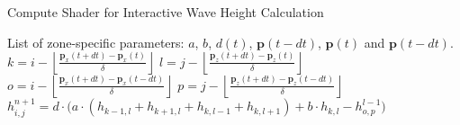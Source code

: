 \begin{algorithm}
\caption{Compute Shader for Interactive Wave Height Calculation}
\label{alg:fdm_compute}
\begin{algorithmic}[1]
\Require List of zone-specific parameters: $a$, $b$, $d(t)$, $\mathbf{p}(t-dt)$, $\mathbf{p}(t)$ and $\mathbf{p}(t-dt)$.
    \State $k = i - \left\lfloor\frac{\mathbf{p}_x(t+dt)-\mathbf{p}_x(t)}{\delta}\right\rfloor$
    \State $l = j - \left\lfloor\frac{\mathbf{p}_z(t+dt)-\mathbf{p}_z(t)}{\delta}\right\rfloor $
    \State $o = i - \left\lfloor\frac{\mathbf{p}_x(t+dt)-\mathbf{p}_x(t-dt)}{\delta}\right\rfloor$
    \State $p = j - \left\lfloor\frac{\mathbf{p}_z(t+dt)-\mathbf{p}_z(t-dt)}{\delta}\right\rfloor$
    \State $h_{i,j}^{n+1} = d \cdot \big(a \cdot (h_{k-1,l} + h_{k+1,l} + h_{k,l-1} + h_{k,l+1})+ b \cdot h_{k,l} - h_{o,p}^{l-1} \big)$
\EndFor
\end{algorithmic}
\end{algorithm}
